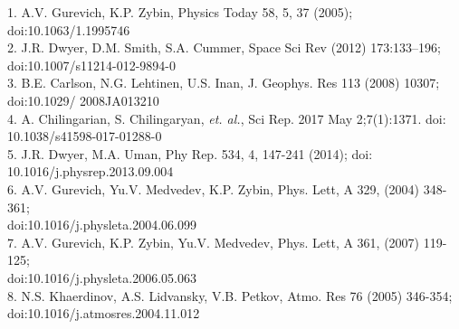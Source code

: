 \documentclass[11pt]{article}
\begin{document}
    \begin{hangparas}{.25in}{1}
    1. A.V. Gurevich, K.P. Zybin, Physics Today 58, 5, 37 (2005); doi:10.1063/1.1995746\\
    
    2. J.R. Dwyer, D.M. Smith, S.A. Cummer, Space Sci Rev (2012) 173:133–196; doi:10.1007/s11214-012-9894-0\\
    
    3. B.E. Carlson, N.G. Lehtinen, U.S. Inan, J. Geophys. Res 113 (2008) 10307; doi:10.1029/ 2008JA013210\\
    
    4. A. Chilingarian, S. Chilingaryan, \emph{et. al.}, Sci Rep. 2017 May 2;7(1):1371. doi: 10.1038/s41598-017-01288-0\\
    
    5. J.R. Dwyer, M.A. Uman, Phy Rep. 534, 4, 147-241 (2014); doi: 10.1016/j.physrep.2013.09.004\\
    
    6. A.V. Gurevich, Yu.V. Medvedev, K.P. Zybin, Phys. Lett, A 329, (2004) 348-361;\\ doi:10.1016/j.physleta.2004.06.099\\
    
    7. A.V. Gurevich, K.P. Zybin, Yu.V. Medvedev, Phys. Lett, A 361, (2007) 119-125;\\ doi:10.1016/j.physleta.2006.05.063\\
    
    8. N.S. Khaerdinov, A.S. Lidvansky, V.B. Petkov, Atmo. Res 76 (2005) 346-354;\\ doi:10.1016/j.atmosres.2004.11.012\\
    \end{hangparas}
\end{document}
